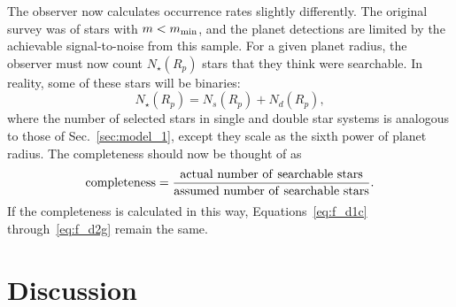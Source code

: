 \documentclass{emulateapj}
\begin{document}
The observer now calculates occurrence rates slightly differently.
The original survey was of stars with $m<m_{\rm min}$, and the
planet detections are limited by the achievable signal-to-noise from this 
sample.
For a given planet radius, the observer must now count $N_\star (R_p)$ stars 
that they think were searchable.
In reality, some of these stars will be binaries:
\begin{equation}
N_\star(R_p) = N_s(R_p) + N_d(R_p),
\end{equation}
where the number of selected stars in single and double star systems is 
analogous to those of Sec.~\ref{sec:model_1}, except they scale as the 
sixth power of planet radius.
The completeness should now be thought of as
\begin{equation}
{\rm completeness} = \frac{{\rm actual\ number\ of\ searchable\ stars}}{{\rm 
assumed\ number\ of\ searchable\ stars}}.
\end{equation}
If the completeness is calculated in this way, 
Equations~\ref{eq:f_d1c} through~\ref{eq:f_d2g} remain the same.






\section{Discussion}
\label{sec:discussion}
\end{document}
